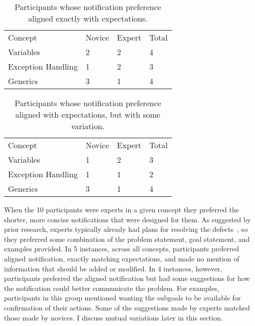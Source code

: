 \begin{table}[]
	\centering
	\caption{Participants whose notification preference aligned exactly with expectations.}
	\label{tab:exact}
	\begin{tabular}{llll}
		Concept            & \multicolumn{1}{c}{Novice} & \multicolumn{1}{c}{Expert} & \multicolumn{1}{c}{Total} \\
		Variables          & 2                          & 2                          & 4                         \\
		Exception Handling & 1                          & 2                          & 3                         \\
		Generics           & 3                          & 1                          & 4                        
	\end{tabular}
\end{table}

\begin{table}[]
	\centering
	\caption{Participants whose notification preference aligned with expectations, but with some variation.}
	\label{tab:variation}
	\begin{tabular}{llll}
		Concept            & \multicolumn{1}{c}{Novice} & \multicolumn{1}{c}{Expert} & \multicolumn{1}{c}{Total} \\
		Variables          & 1                          & 2                          & 3                         \\
		Exception Handling & 1                          & 1                          & 2                         \\
		Generics           & 3                          & 1                          & 4                        
	\end{tabular}
\end{table}



When the 10 participants were experts in a given concept they preferred the shorter, more concise notifications that were designed for them.
As suggested by prior research, experts typically already had plans for resolving the defects~\cite{larkin1980expert, Wiedenbeck:1993:Mental}, so they preferred some combination of the problem statement, goal statement, and examples provided.
In 5 instances, across all concepts, participants preferred aligned notification, exactly matching expectations, and made no mention of information that should be added or modified.
In 4 instances, however, participants preferred the aligned notification but had some suggestions for how the notification could better communicate the problem.
For examples, participants in this group mentioned wanting the subgoals to be available for confirmation of their actions.
Some of the suggestions made by experts matched those made by novices. I discuss mutual variations later in this section.


